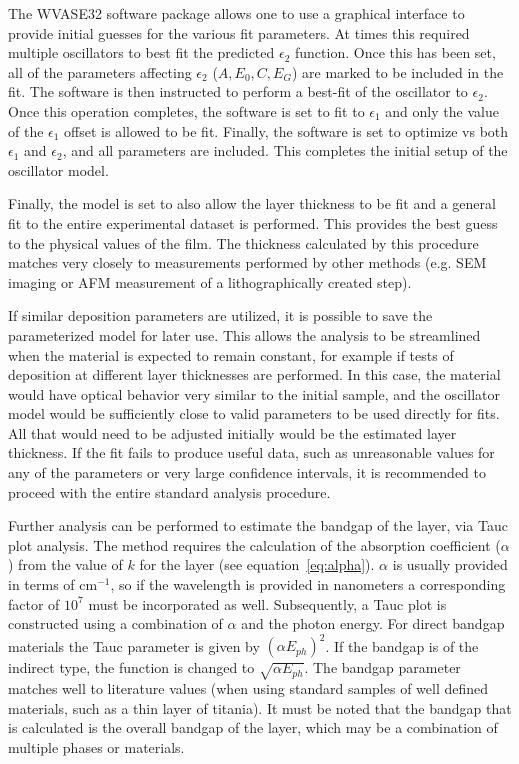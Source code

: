 \indent The WVASE32 software package allows one to use a graphical interface to provide initial guesses for the various fit parameters. At times this required multiple oscillators to best fit the predicted $\epsilon_{2}$ function. Once this has been set, all of the parameters affecting $\epsilon_{2}$ ($A, E_{0}, C, E_{G}$) are marked to be included in the fit. The software is then instructed to perform a best-fit of the oscillator to $\epsilon_{2}$. Once this operation completes, the software is set to fit to $\epsilon_{1}$ and only the value of the $\epsilon_{1}$ offset is allowed to be fit. Finally, the software is set to optimize vs both $\epsilon_{1}$ and $\epsilon_{2}$, and all parameters are included. This completes the initial setup of the oscillator model. 

Finally, the model is set to also allow the layer thickness to be fit and a general fit to the entire experimental dataset is performed. This provides the best guess to the physical values of the film. The thickness calculated by this procedure matches very closely to measurements performed by other methods (e.g. SEM imaging or AFM measurement of a lithographically created step). 

If similar deposition parameters are utilized, it is possible to save the parameterized model for later use. This allows the analysis to be streamlined when the material is expected to remain constant, for example if tests of deposition at different layer thicknesses are performed. In this case, the material would have optical behavior very similar to the initial sample, and the oscillator model would be sufficiently close to valid parameters to be used directly for fits. All that would need to be adjusted initially would be the estimated layer thickness. If the fit fails to produce useful data, such as unreasonable values for any of the parameters or very large confidence intervals, it is recommended to proceed with the entire standard analysis procedure. 

Further analysis can be performed to estimate the bandgap of the layer, via Tauc plot analysis. The method requires the calculation of the absorption coefficient ($\alpha$) from the value of $k$ for the layer (see equation~\vref{eq:alpha}). $\alpha$ is usually provided in terms of cm$^{-1}$, so if the wavelength is provided in nanometers a corresponding factor of $10^{7}$ must be incorporated as well. Subsequently, a Tauc plot is constructed using a combination of $\alpha$ and the photon energy. For direct bandgap materials the Tauc parameter is given by $\left(\alpha E_{ph}\right)^{2}$. If the bandgap is of the indirect type, the function is changed to $\sqrt{\alpha E_{ph}}$. The bandgap parameter matches well to literature values (when using standard samples of well defined materials, such as a thin layer of titania). It must be noted that the bandgap that is calculated is the overall bandgap of the layer, which may be a combination of multiple phases or materials. 

